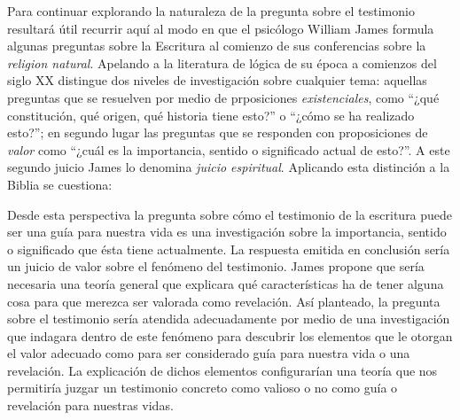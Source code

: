   Para continuar explorando la naturaleza de la pregunta sobre el testimonio
  resultará útil recurrir aquí al modo en que el psicólogo William James formula
  algunas preguntas sobre la Escritura al comienzo de sus conferencias sobre la
  \emph{religion natural}. Apelando a la literatura de lógica de su época a
  comienzos del siglo XX distingue dos niveles de investigación sobre cualquier
  tema: aquellas preguntas que se resuelven por medio de prposiciones
  \emph{existenciales}, como ``¿qué constitución, qué origen, qué historia tiene
  esto?'' o ``¿cómo se ha realizado esto?''; en segundo lugar las preguntas que se
  responden con proposiciones de \emph{valor} como ``¿cuál es la importancia,
  sentido o significado actual de esto?''. A este segundo juicio James lo denomina
  \emph{juicio espiritual}. Aplicando esta distinción a la Biblia se cuestiona:


  Desde esta perspectiva la pregunta sobre cómo el testimonio de la escritura
  puede ser una guía para nuestra vida es una investigación sobre la importancia,
  sentido o significado que ésta tiene actualmente. La respuesta emitida en
  conclusión sería un juicio de valor sobre el fenómeno del testimonio. James
  propone que sería necesaria una teoría general que explicara qué características
  ha de tener alguna cosa para que merezca ser valorada como revelación. Así
  planteado, la pregunta sobre el testimonio sería atendida adecuadamente por
  medio de una investigación que indagara dentro de este fenómeno para descubrir
  los elementos que le otorgan el valor adecuado como para ser considerado guía
  para nuestra vida o una revelación. La explicación de dichos elementos
  configurarían una teoría que nos permitiría juzgar un testimonio concreto como
  valioso o no como guía o revelación para nuestras vidas.

